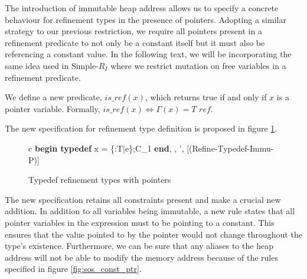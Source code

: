 \documentclass[a4paper,12pt]{report}
\begin{document}
\par
The introduction of immutable heap address allows us to specify a concrete 
behaviour for refinement types in the presence of pointers. Adopting a similar 
strategy to our previous restriction, we require all pointers present in a 
refinement predicate to not only be a constant itself but it must also be 
referencing a constant value. In the following text, we will be incorporating 
the same idea used in Simple-$R_{I}$ where we 
restrict mutation on free variables in a refinement predicate. 

\par
We define a new predicate, $is\_ref(x)$, which returns true if and only if $x$ 
is a pointer variable. Formally, $is\_ref(x) \Leftrightarrow \Gamma(x) = T\textit{ ref}$.
\par
The new specification for refinement type definition 
is proposed in figure \ref{fig:immu_pointer_typedef}.

\begin{figure}[h]
  \begin{center}
    \begin{tabular}{c}
      {\langle \textbf{begin typedef } x = \{\upsilon :T\text{ }|\text{ }e\};C_1\textbf{ end}, 
      \sigma, \tau \rangle \longrightarrow 
        \langle \sigma', \tau \rangle}[(Refine-Typedef-Immu-P)]
    \end{tabular}
  \end{center}
  \caption{Typedef refinement types with pointers}
  \label{fig:immu_pointer_typedef}
\end{figure}

\par
The new specification retains all constraints present and make a crucial 
new addition. In addition to all variables being immutable, a new rule states 
that all pointer variables in the expression must to be pointing to a constant. 
This ensures that the value pointed 
to by the pointer would not change throughout the type's existence. Furthermore, 
we can be sure that any aliases to the heap 
address will not be able to modify the memory address because of the rules 
specified in figure \ref{fig:sos_const_ptr}.
\end{document}
